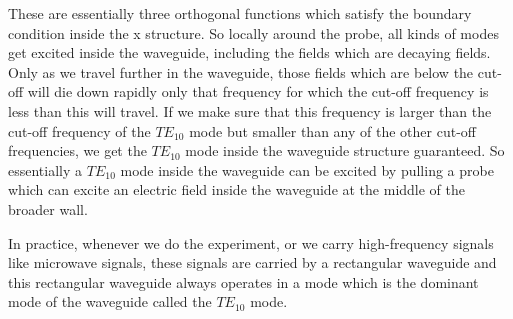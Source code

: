 These are essentially three orthogonal functions which satisfy the boundary condition inside the x structure. So locally around the probe, all kinds of modes get excited inside the waveguide, including the fields which are decaying fields. Only as we travel further in the waveguide, those fields which are below the cut-off will die down rapidly only that frequency for which the cut-off frequency is less than this will travel. If we make sure that this frequency is larger than the cut-off frequency of the $TE_{10}$ mode but smaller than any of the other cut-off frequencies, we get the $TE_{10}$ mode inside the waveguide structure guaranteed. So essentially a $TE_{10}$ mode inside the waveguide can be excited by pulling a probe which can excite an electric field inside the waveguide at the middle of the broader wall.

In practice, whenever we do the experiment, or we carry high-frequency signals like microwave signals, these signals are carried by a rectangular waveguide and this rectangular waveguide always operates in a mode which is the dominant mode of the waveguide called the $TE_{10}$ mode.

